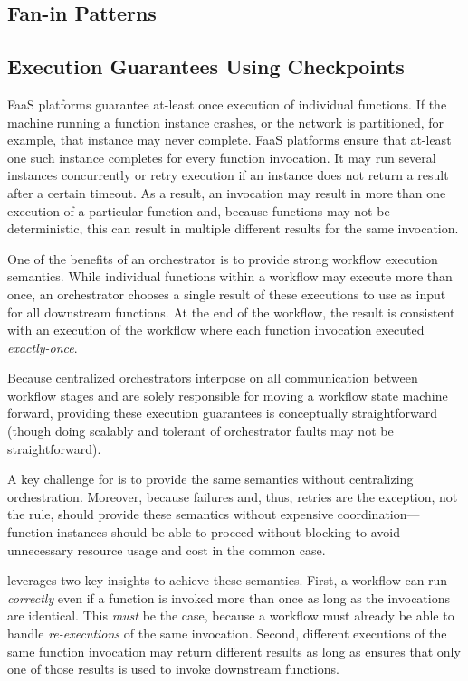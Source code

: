 \subsection{Fan-in Patterns}\label{sec:design:fanin}

\subsection{Execution Guarantees Using Checkpoints}\label{sec:design:execution}

FaaS platforms guarantee at-least once execution of individual functions. If the
machine running a function instance crashes, or the network is partitioned, for
example, that instance may never complete. FaaS platforms ensure that at-least
one such instance completes for every function invocation. It may run several
instances concurrently or retry execution if an instance does not return a
result after a certain timeout. As a result, an invocation may result in more
than one execution of a particular function and, because functions may not be
deterministic, this can result in multiple different results for the same
invocation.

One of the benefits of an orchestrator is to provide strong workflow execution
semantics. While individual functions within a workflow may execute more than
once, an orchestrator chooses a single result of these executions to use as
input for all downstream functions. At the end of the workflow, the result is
consistent with an execution of the workflow where each function invocation
executed \emph{exactly-once}.

Because centralized orchestrators interpose on all communication between
workflow stages and are solely responsible for moving a workflow state machine
forward, providing these execution guarantees is conceptually straightforward
(though doing scalably and tolerant of orchestrator faults may not be
straightforward).

A key challenge for \name{} is to provide the same semantics without
centralizing orchestration. Moreover, because failures and, thus, retries are
the exception, not the rule, \name{} should provide these semantics without
expensive coordination---function instances should be able to proceed without
blocking to avoid unnecessary resource usage and cost in the common case.

\name{} leverages two key insights to achieve these semantics. First, a workflow
can run \emph{correctly} even if a function is invoked more than once as long as
the invocations are identical. This \emph{must} be the case, because a workflow
must already be able to handle \emph{re-executions} of the same invocation.
Second, different executions of the same function invocation may return
different results as long as \name{} ensures that only one of those results is
used to invoke downstream functions.

